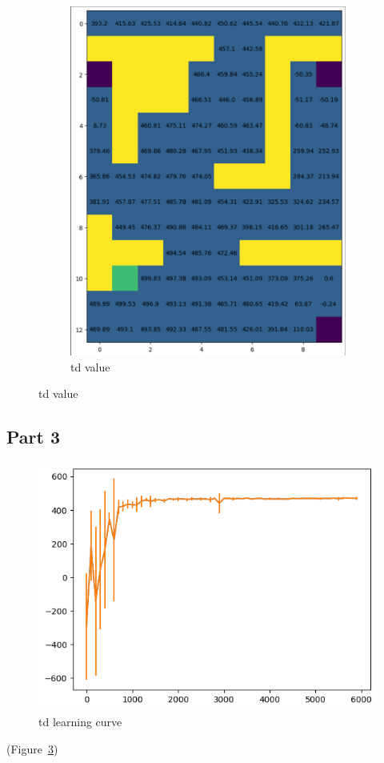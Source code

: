 \documentclass{article}
\begin{document}
\begin{figure}[h]
\begin{subfigure} {0.5\textwidth}
            \includegraphics[width=0.9\linewidth]{images/mc_value}
            \caption{td value}\label{fig:td_value}
        \end{subfigure}
    \end{figure}

    \subsection{Part 3}\label{subsec:question-3-3}
    \begin{figure}[h]
        \includegraphics[width=0.9\linewidth]{images/td_learning_curve}
        \caption{td learning curve}\label{fig:td_learning_curve}
    \end{figure}
    (Figure~\ref{fig:td_learning_curve})
\end{document}
